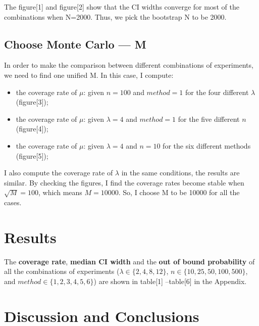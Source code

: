 \documentclass[12pt]{article}
\begin{document}
The figure[1] and figure[2] show that the CI widths converge for most of the combinations when N=2000. Thus, we pick the bootstrap N to be 2000.\\




\subsection{Choose Monte Carlo --- M}
In order to make the comparison between different combinations of experiments, we need to find one unified M. In this case, I compute:
\begin{itemize}
 \item the coverage rate of $\mu$:  given $n=100$ and $method=1$ for the four different $\lambda$ (figure[3]);
 \item the coverage rate of $\mu$:  given $\lambda=4$ and $method=1$ for the five different $n$ (figure[4]);
 \item the coverage rate of $\mu$:  given $\lambda=4$ and $n=10$  for the six different methods (figure[5]);
 \end{itemize}

I also compute the coverage rate of $\lambda$ in the same conditions, the results are similar. By checking the figures, I find the coverage rates become stable when $\sqrt{M}=100$, which means $M=10000$. So, I choose M to be 10000 for all the cases.\\






\section{Results}

The \textbf{coverage rate}, \textbf{median CI width} and the \textbf{out of bound probability} of all the combinations of experiments ($\lambda \in \{2,4,8,12\}$, $n \in \{10,25,50,100,500\}$, and $method \in \{1,2,3,4,5,6\}$) are shown in table[1] --table[6] in the Appendix.







\section{Discussion and Conclusions}
\end{document}
